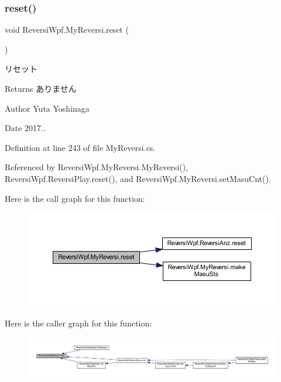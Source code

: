 \subsubsection{\texorpdfstring{reset()}{reset()}}
{\footnotesize\ttfamily void Reversi\+Wpf.\+My\+Reversi.\+reset (\begin{DoxyParamCaption}{ }\end{DoxyParamCaption})}



リセット 

\begin{DoxyReturn}{Returns}
ありません 
\end{DoxyReturn}
\begin{DoxyAuthor}{Author}
Yuta Yoshinaga 
\end{DoxyAuthor}
\begin{DoxyDate}{Date}
2017.. 
\end{DoxyDate}


Definition at line 243 of file My\+Reversi.\+cs.



Referenced by Reversi\+Wpf.\+My\+Reversi.\+My\+Reversi(), Reversi\+Wpf.\+Reversi\+Play.\+reset(), and Reversi\+Wpf.\+My\+Reversi.\+set\+Masu\+Cnt().

Here is the call graph for this function\+:
\nopagebreak
\begin{figure}[H]
\begin{center}
\leavevmode
\includegraphics[width=350pt]{class_reversi_wpf_1_1_my_reversi_a61b1ee2e28cc4050ebbda2e54c7a60b6_cgraph}
\end{center}
\end{figure}
Here is the caller graph for this function\+:
\nopagebreak
\begin{figure}[H]
\begin{center}
\leavevmode
\includegraphics[width=350pt]{class_reversi_wpf_1_1_my_reversi_a61b1ee2e28cc4050ebbda2e54c7a60b6_icgraph}
\end{center}
\end{figure}
\mbox{\label{class_reversi_wpf_1_1_my_reversi_a0c99040662eebcca741bdda303f07eb6}} 
